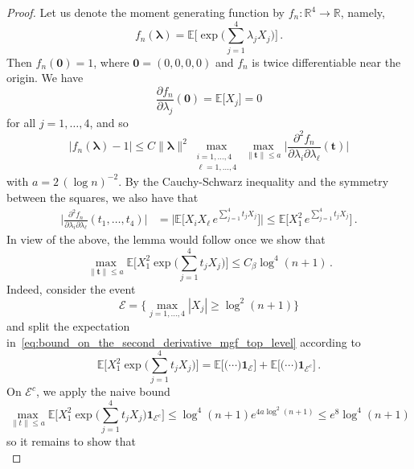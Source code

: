 \documentclass[10pt,a4paper]{amsart}
\def\la{{\lambda}}
\newcommand{\bE}{\mathbb E}
\newcommand{\bR}{\mathbb R}
\begin{document}
	\begin{proof}
		Let us denote the moment generating function by $f_n:\bR^4 \to \bR$, namely,
		\begin{equation*}
			f_n(\boldsymbol{\la}) = \bE\bigg[\exp\Big(\sum_{j=1}^{4} \la_j X_j\Big)\bigg]\, .
		\end{equation*}
		Then $f_n(\boldsymbol{0}) = 1$, where $\boldsymbol{0} = (0,0,0,0)$ and $f_n$ is twice differentiable near the origin. We have
		\[
		\frac{\partial f_n}{\partial \la_j} (\boldsymbol{0}) = \bE\big[X_j\big] = 0
		\]
		for all $j=1,\ldots,4$, and so
		\[
		\big|f_n(\boldsymbol{\la}) - 1\big|\le  C \|\boldsymbol{\la}\|^2 \max_{\substack{i=1,\ldots,4 \\ \ell=1,\ldots,4}} \max_{\|\boldsymbol{t} \|\le a} \Big|\frac{\partial^2 f_n}{\partial \la_i \partial \la_\ell} (\boldsymbol{t})\Big| 
		\]
		with $a = 2\, (\log n)^{-2}$. By the Cauchy-Schwarz inequality and the symmetry between the squares, we also have that
		\begin{align*}
			\Big|\frac{\partial^2 f_n}{\partial \la_i \partial \la_\ell} (t_1,\ldots,t_4)\Big| &= \Big|\bE\Big[X_i X_\ell \, e^{\sum_{j=1}^{4}t_j X_j}\Big]\Big| \le \bE\Big[X_1^2 \, e^{\sum_{j=1}^{4}t_j X_j}\Big]\, .
		\end{align*}
		In view of the above, the lemma would follow once we show that
		\begin{equation}
			\label{eq:bound_on_the_second_derivative_mgf_top_level}
			\max_{\|\boldsymbol{t} \|\le a} \bE\Big[X_1^2 \exp\Big(\sum_{j=1}^{4}t_j X_j\Big)\Big] \le C_\beta \log^4(n+1) \, . 
		\end{equation}
		Indeed, consider the event
		\begin{equation*}
			\mathcal{E} = \Big\{ \max_{j=1,\ldots,4} |X_j| \ge \log^2 (n+1) \Big\}
		\end{equation*}
		and split the expectation in~\eqref{eq:bound_on_the_second_derivative_mgf_top_level} according to
		\begin{equation*}
			\bE\Big[X_1^2 \exp\Big(\sum_{j=1}^{4}t_j X_j\Big)\Big] = \bE\Big[\big(\cdots\big) \mathbf{1}_{\mathcal{E}}\Big] + \bE\Big[\big(\cdots\big) \mathbf{1}_{\mathcal{E}^c}\Big] \, .
		\end{equation*}
		On $\mathcal{E}^c$, we apply the naive bound
		\[
		\max_{\|t\|\le a}\bE\Big[X_1^2 \exp\Big(\sum_{j=1}^{4}t_j X_j\Big)\mathbf{1}_{\mathcal{E}^c}\Big] \le \log^4(n+1) e^{4 a \log^2(n+1) } \le e^8\log^4(n+1)
		\]
		so it remains to show that
		\begin{equation}
			\label{eq:bound_on_the_second_derivative_mgf_top_level_good_event}

\end{equation}
\end{proof}
\end{document}
